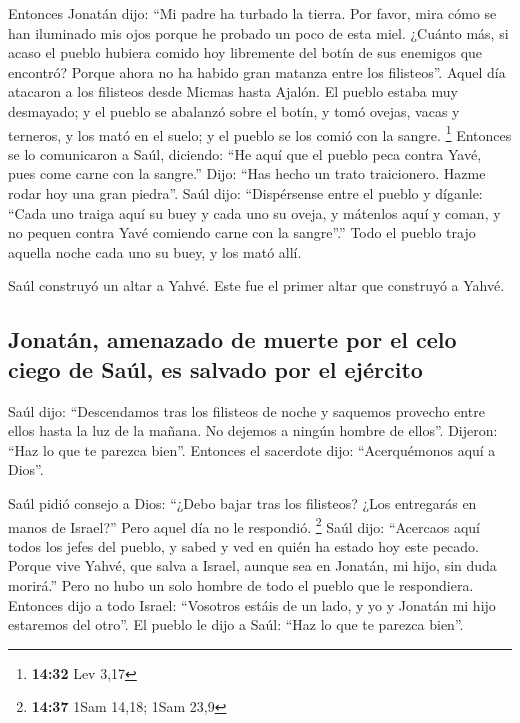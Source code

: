 \begin{paracol}{2}
 Entonces Jonatán dijo: ``Mi padre ha turbado la tierra.
Por favor, mira cómo se han iluminado mis ojos porque he probado un poco
de esta miel.  ¿Cuánto más, si acaso el pueblo hubiera
comido hoy libremente del botín de sus enemigos que encontró? Porque
ahora no ha habido gran matanza entre los filisteos''. 
Aquel día atacaron a los filisteos desde Micmas hasta Ajalón. El pueblo
estaba muy desmayado;  y el pueblo se abalanzó sobre el
botín, y tomó ovejas, vacas y terneros, y los mató en el suelo; y el
pueblo se los comió con la sangre. \footnote{\textbf{14:32} Lev 3,17}
 Entonces se lo comunicaron a Saúl, diciendo: ``He aquí
que el pueblo peca contra Yavé, pues come carne con la sangre.'' Dijo:
``Has hecho un trato traicionero. Hazme rodar hoy una gran piedra''.
 Saúl dijo: ``Dispérsense entre el pueblo y díganle:
``Cada uno traiga aquí su buey y cada uno su oveja, y mátenlos aquí y
coman, y no pequen contra Yavé comiendo carne con la sangre''.'' Todo el
pueblo trajo aquella noche cada uno su buey, y los mató allí.

 Saúl construyó un altar a Yahvé. Este fue el primer
altar que construyó a Yahvé.

\hypertarget{jonatuxe1n-amenazado-de-muerte-por-el-celo-ciego-de-sauxfal-es-salvado-por-el-ejuxe9rcito}{%
\subsection{Jonatán, amenazado de muerte por el celo ciego de Saúl, es
salvado por el
ejército}\label{jonatuxe1n-amenazado-de-muerte-por-el-celo-ciego-de-sauxfal-es-salvado-por-el-ejuxe9rcito}}

 Saúl dijo: ``Descendamos tras los filisteos de noche y
saquemos provecho entre ellos hasta la luz de la mañana. No dejemos a
ningún hombre de ellos''. Dijeron: ``Haz lo que te parezca bien''.
Entonces el sacerdote dijo: ``Acerquémonos aquí a Dios''.

 Saúl pidió consejo a Dios: ``¿Debo bajar tras los
filisteos? ¿Los entregarás en manos de Israel?'' Pero aquel día no le
respondió. \footnote{\textbf{14:37} 1Sam 14,18; 1Sam 23,9}
 Saúl dijo: ``Acercaos aquí todos los jefes del pueblo, y
sabed y ved en quién ha estado hoy este pecado.  Porque
vive Yahvé, que salva a Israel, aunque sea en Jonatán, mi hijo, sin duda
morirá.'' Pero no hubo un solo hombre de todo el pueblo que le
respondiera.  Entonces dijo a todo Israel: ``Vosotros
estáis de un lado, y yo y Jonatán mi hijo estaremos del otro''. El
pueblo le dijo a Saúl: ``Haz lo que te parezca bien''.


\end{paracol}
